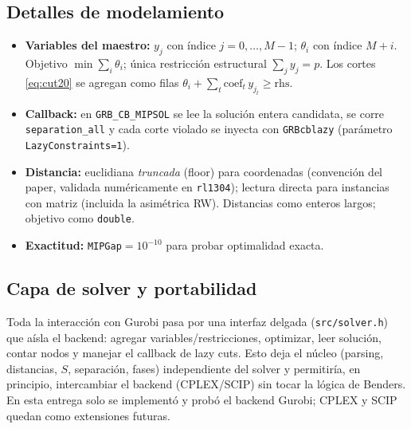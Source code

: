 \subsection{Detalles de modelamiento}
\begin{itemize}[noitemsep]
  \item \textbf{Variables del maestro:} $y_j$ con índice $j=0,\dots,M-1$; $\theta_i$ con índice
        $M+i$. Objetivo $\min\sum_i\theta_i$; única restricción estructural $\sum_j y_j=p$. Los
        cortes \eqref{eq:cut20} se agregan como filas $\theta_i + \sum_t \text{coef}_t\,y_{j_t}\ge
        \text{rhs}$.
  \item \textbf{Callback:} en \texttt{GRB\_CB\_MIPSOL} se lee la solución entera candidata, se
        corre \texttt{separation\_all} y cada corte violado se inyecta con \texttt{GRBcblazy}
        (parámetro \texttt{LazyConstraints=1}).
  \item \textbf{Distancia:} euclidiana \emph{truncada} (floor) para coordenadas (convención del
        paper, validada numéricamente en \texttt{rl1304}); lectura directa para instancias con
        matriz (incluida la asimétrica RW). Distancias como enteros largos; objetivo como
        \texttt{double}.
  \item \textbf{Exactitud:} \texttt{MIPGap}$=10^{-10}$ para probar optimalidad exacta.
\end{itemize}

\subsection{Capa de solver y portabilidad}
Toda la interacción con Gurobi pasa por una interfaz delgada (\texttt{src/solver.h}) que aísla el
backend: agregar variables/restricciones, optimizar, leer solución, contar nodos y manejar el
callback de lazy cuts. Esto deja el núcleo (parsing, distancias, $S$, separación, fases)
independiente del solver y permitiría, en principio, intercambiar el backend (CPLEX/SCIP) sin
tocar la lógica de Benders. En esta entrega solo se implementó y probó el backend Gurobi; CPLEX y
SCIP quedan como extensiones futuras.
